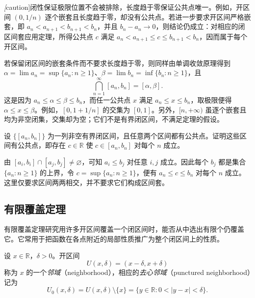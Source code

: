 \begin{remark}
\label{rem:nested-interval-assumptions}
\emph[caution]{闭性保证极限位置不会被排除，长度趋于零保证公共点唯一。}例如，开区间 $(0,1/n)$ 逐个嵌套且长度趋于零，却没有公共点。若进一步要求开区间严格嵌套，即 $a_n<a_{n+1}<b_{n+1}<b_n$，并且 $b_n-a_n\to0$，则结论仍成立：对相应的闭区间套应用定理，所得公共点 $c$ 满足 $a_n<a_{n+1}\leq c\leq b_{n+1}<b_n$，因而属于每个开区间。

若保留闭区间的嵌套条件而不要求长度趋于零，则同样由单调收敛原理得到 $\alpha=\lim a_n=\sup\{a_n:n\geq1\}$、$\beta=\lim b_n=\inf\{b_n:n\geq1\}$，且
\begin{equation}
    \bigcap_{n=1}^{\infty}[a_n,b_n]=[\alpha,\beta].
    \label{eq:nested-interval-intersection}
\end{equation}
这是因为 $a_n\leq\alpha\leq\beta\leq b_n$，而任一公共点 $x$ 满足 $a_n\leq x\leq b_n$，取极限便得 $\alpha\leq x\leq\beta$。例如，$[0,1+1/n]$ 的交集为 $[0,1]$。另外，$[n,+\infty)$ 虽逐个嵌套且均为非空闭集，交集却为空；它们不是有界闭区间，不满足定理的假设。
\end{remark}

\begin{example}
设 $\{[a_n,b_n]\}$ 为一列非空有界闭区间，且任意两个区间都有公共点。证明这些区间有公共点，即存在 $c\in\mathbb{R}$ 使 $c\in[a_n,b_n]$ 对每个 $n$ 成立。
\end{example}

\begin{solve}
由 $[a_i,b_i]\cap[a_j,b_j]\neq\varnothing$，可知 $a_i\leq b_j$ 对任意 $i,j$ 成立。因此每个 $b_j$ 都是集合 $\{a_n:n\geq1\}$ 的上界，令 $c=\sup\{a_n:n\geq1\}$，便有 $a_n\leq c\leq b_n$ 对每个 $n$ 成立。这里仅要求区间两两相交，并不要求它们构成区间套。
\end{solve}

\subsection{有限覆盖定理}
\label{subsec:finite-covering-theorem}

有限覆盖定理研究用许多开区间覆盖一个闭区间时，能否从中选出有限个仍覆盖它。它常用于把函数在各点附近的局部性质推广为整个闭区间上的性质。

\begin{definition}
\label{def:real-neighborhood}
设 $x\in\mathbb{R}$，$\delta>0$。开区间
\[
    U(x,\delta)=(x-\delta,x+\delta)
\]
称为 $x$ 的一个\emph{邻域}（neighborhood），相应的\emph{去心邻域}（punctured neighborhood）记为
\[
    U_0(x,\delta)=U(x,\delta)\setminus\{x\}
    =\{y\in\mathbb{R}:0<|y-x|<\delta\}.
\]
\end{definition}

